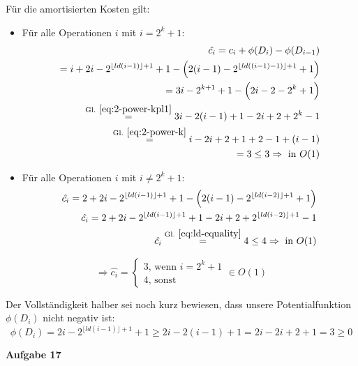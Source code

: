\documentclass{article}
\begin{document}
Für die amortisierten Kosten gilt: 
\begin{itemize}
  \item Für alle Operationen $i$ mit $i=2^k+1$:\\
    \begin{align*}
    \hat{c_i} = c_i + \phi(D_i) - \phi(D_{i-1}) \\
    = i + 2i - 2^{\lfloor ld(i - 1) \rfloor + 1} + 1 - \left( 2(i - 1) - 2^{\lfloor ld((i - 1) - 1) \rfloor + 1} + 1 \right) \\
    = 3i - 2^{k + 1} + 1 - \left( 2i - 2 - 2^k + 1 \right) \\
    \stackrel{\mathrm{Gl.~\ref{eq:2-power-kpl1}}}= 3i - 2(i - 1) + 1 - 2i + 2 + 2^k - 1 \\
    \stackrel{\mathrm{Gl.~\ref{eq:2-power-k}}}= i - 2i + 2 + 1 + 2 - 1 + (i - 1) \\
    = 3 \leq 3 \Rightarrow\text{ in }O(1)
    \end{align*}
  \item Für alle Operationen $i$ mit $i\neq2^k+1$:\\
    \begin{align*}
    \hat{c_i} = 2 + 2i - 2^{\lfloor ld(i - 1) \rfloor + 1} + 1 - \left( 2(i - 1) - 2^{\lfloor ld(i - 2) \rfloor + 1} + 1 \right) \\
    \hat{c_i} = 2 + 2i - 2^{\lfloor ld(i - 1) \rfloor + 1} + 1 - 2i + 2 + 2^{\lfloor ld(i - 2) \rfloor + 1} - 1 \\
    \hat{c_i} \stackrel{\mathrm{Gl.~\ref{eq:ld-equality}}}= 4 \leq 4 \Rightarrow\text{ in }O(1)
    \end{align*}
\end{itemize}

\begin{equation}
\Longrightarrow \hat{c_i} = \begin{cases}3\text{, wenn }i = 2^k + 1 \\ 4\text{, sonst}\end{cases}\in O(1)
\end{equation}

Der Vollst{\"a}ndigkeit halber sei noch kurz bewiesen, dass unsere
Potentialfunktion $\phi(D_i)$ nicht negativ ist:
\begin{equation}
  \phi(D_i) = 2i - 2^{\lfloor ld(i - 1) \rfloor + 1} + 1 \geq 2i - 2(i - 1) + 1 = 2i - 2i + 2 + 1 = 3 \geq 0
\end{equation}

\clearpage

{\bfseries Aufgabe 17}%
\end{document}
